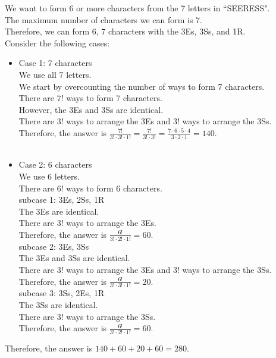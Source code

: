 \documentclass[12pt]{exam}
\begin{document}
\begin{solution}
	We want to form 6 or more characters from the 7 letters in ``SEERESS".\\
	The maximum number of characters we can form is 7.\\
	Therefore, we can form 6, 7 characters with the 3Es, 3Ss, and 1R.\\
	Consider the following cases:
	\begin{itemize}
		\item Case 1: 7 characters\\
		      We use all 7 letters.\\
		      We start by overcounting the number of ways to form 7 characters.\\
		      There are $7!$ ways to form 7 characters.\\
		      However, the 3Es and 3Ss are identical.\\
		      There are $3!$ ways to arrange the 3Es and $3!$ ways to arrange the 3Ss.\\
		      Therefore, the answer is $\frac{7!}{3! \cdot 3!\cdot 1!} = \frac{7!}{3! \cdot 3!}= \frac{7\cdot 6\cdot 5\cdot 4}{3\cdot 2\cdot 1} = 140$.\\\\
		\item Case 2: 6 characters\\
		      We use 6 letters.\\
		      There are $6!$ ways to form 6 characters.\\
		      subcase 1: 3Es, 2Ss, 1R\\
		      The 3Es are identical.\\
		      There are $3!$ ways to arrange the 3Es.\\
		      Therefore, the answer is $\frac{6!}{3! \cdot 2!\cdot 1!} = 60$.\\
		      subcase 2: 3Es, 3Ss\\
		      The 3Es and 3Ss are identical.\\
		      There are $3!$ ways to arrange the 3Es and $3!$ ways to arrange the 3Ss.\\
		      Therefore, the answer is $\frac{6!}{3! \cdot 3!\cdot 1!} = 20$.\\
		      subcase 3: 3Ss, 2Es, 1R\\
		      The 3Ss are identical.\\
		      There are $3!$ ways to arrange the 3Ss.\\
		      Therefore, the answer is $\frac{6!}{3! \cdot 2!\cdot 1!} = 60$.\\
	\end{itemize}
	Therefore, the answer is $140 + 60 + 20 + 60 = 280$.

\end{solution}
\end{document}
